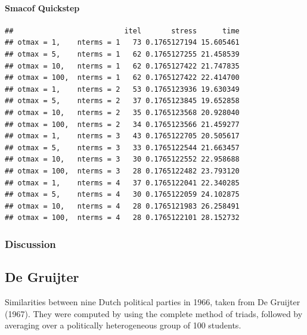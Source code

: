 \documentclass[
  12pt,
]{article}
\newenvironment{Shaded}{\begin{snugshade}}{\end{snugshade}}
\newcommand{\AttributeTok}[1]{\textcolor[rgb]{0.13,0.29,0.53}{#1}}
\newcommand{\DecValTok}[1]{\textcolor[rgb]{0.00,0.00,0.81}{#1}}
\newcommand{\FunctionTok}[1]{\textcolor[rgb]{0.13,0.29,0.53}{\textbf{#1}}}
\newcommand{\NormalTok}[1]{#1}
\newcommand{\OtherTok}[1]{\textcolor[rgb]{0.56,0.35,0.01}{#1}}
\newcommand{\SpecialCharTok}[1]{\textcolor[rgb]{0.81,0.36,0.00}{\textbf{#1}}}
\begin{document}
\paragraph{Smacof Quickstep}\label{smacof-quickstep-3}

\begin{Shaded}
\end{Shaded}

\begin{verbatim}
##                          itel       stress      time
## otmax = 1,    nterms = 1   73 0.1765127194 15.605461
## otmax = 5,    nterms = 1   62 0.1765127255 21.458539
## otmax = 10,   nterms = 1   62 0.1765127422 21.747835
## otmax = 100,  nterms = 1   62 0.1765127422 22.414700
## otmax = 1,    nterms = 2   53 0.1765123936 19.630349
## otmax = 5,    nterms = 2   37 0.1765123845 19.652858
## otmax = 10,   nterms = 2   35 0.1765123568 20.928040
## otmax = 100,  nterms = 2   34 0.1765123566 21.459277
## otmax = 1,    nterms = 3   43 0.1765122705 20.505617
## otmax = 5,    nterms = 3   33 0.1765122544 21.663457
## otmax = 10,   nterms = 3   30 0.1765122552 22.958688
## otmax = 100,  nterms = 3   28 0.1765122482 23.793120
## otmax = 1,    nterms = 4   37 0.1765122041 22.340285
## otmax = 5,    nterms = 4   30 0.1765122059 24.102875
## otmax = 10,   nterms = 4   28 0.1765121983 26.258491
## otmax = 100,  nterms = 4   28 0.1765122101 28.152732
\end{verbatim}

\subsubsection{Discussion}\label{discussion-2}

\subsection{De Gruijter}\label{de-gruijter}

Similarities between nine Dutch political parties in 1966, taken from De Gruijter (1967).
They were computed by using the complete method of triads, followed by
averaging over a politically heterogeneous group of 100 students.
\end{document}
